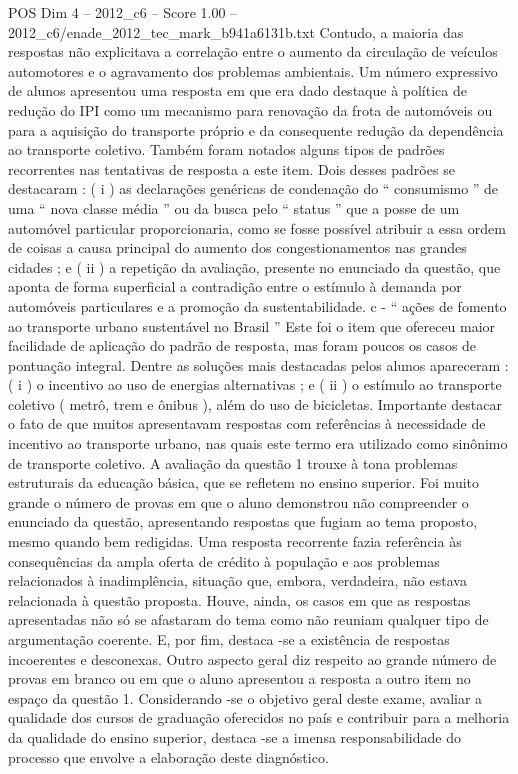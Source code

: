 \begin{textsample}{POS Dim 4 – 2012\_c6 – Score 1.00 – 2012\_c6/enade\_2012\_tec\_mark\_b941a6131b.txt}
Contudo, a maioria das respostas não explicitava a correlação entre o aumento da circulação de veículos automotores e o agravamento dos problemas ambientais.
Um número expressivo de alunos apresentou uma resposta em que era dado destaque à política de redução do IPI como um mecanismo para renovação da frota de automóveis ou para a aquisição do transporte próprio e da consequente redução da dependência ao transporte coletivo.
Também foram notados alguns tipos de padrões recorrentes nas tentativas de resposta a este item.
Dois desses padrões se destacaram : ( i ) as declarações genéricas de condenação do “ consumismo ” de uma “ nova classe média ” ou da busca pelo “ status ” que a posse de um automóvel particular proporcionaria, como se fosse possível atribuir a essa ordem de coisas a causa principal do aumento dos congestionamentos nas grandes cidades ; e ( ii ) a repetição da avaliação, presente no enunciado da questão, que aponta de forma superficial a contradição entre o estímulo à demanda por automóveis particulares e a promoção da sustentabilidade. c - “ ações de fomento ao transporte urbano sustentável no Brasil ” Este foi o item que ofereceu maior facilidade de aplicação do padrão de resposta, mas foram poucos os casos de pontuação integral.
Dentre as soluções mais destacadas pelos alunos apareceram : ( i ) o incentivo ao uso de energias alternativas ; e ( ii ) o estímulo ao transporte coletivo ( metrô, trem e ônibus ), além do uso de bicicletas.
Importante destacar o fato de que muitos apresentavam respostas com referências à necessidade de incentivo ao transporte urbano, nas quais este termo era utilizado como sinônimo de transporte coletivo.
A avaliação da questão 1 trouxe à tona problemas estruturais da educação básica, que se refletem no ensino superior.
Foi muito grande o número de provas em que o aluno demonstrou não compreender o enunciado da questão, apresentando respostas que fugiam ao tema proposto, mesmo quando bem redigidas.
Uma resposta recorrente fazia referência às consequências da ampla oferta de crédito à população e aos problemas relacionados à inadimplência, situação que, embora, verdadeira, não estava relacionada à questão proposta.
Houve, ainda, os casos em que as respostas apresentadas não só se afastaram do tema como não reuniam qualquer tipo de argumentação coerente.
E, por fim, destaca -se a existência de respostas incoerentes e desconexas.
Outro aspecto geral diz respeito ao grande número de provas em branco ou em que o aluno apresentou a resposta a outro item no espaço da questão 1.
Considerando -se o objetivo geral deste exame, avaliar a qualidade dos cursos de graduação oferecidos no país e contribuir para a melhoria da qualidade do ensino superior, destaca -se a imensa responsabilidade do processo que envolve a elaboração deste diagnóstico.

\end{textsample}
